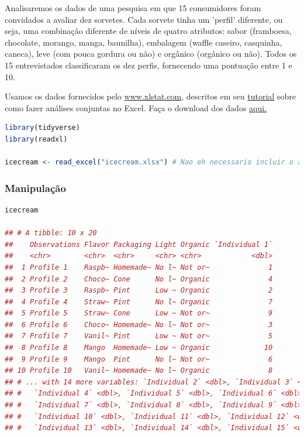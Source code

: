 \documentclass{article}
\begin{document}
Analisaremos os dados de uma pesquisa em que 15 consumidores foram convidados a avaliar dez sorvetes. Cada sorvete tinha um 'perfil' diferente, ou seja, uma combinação diferente de níveis de quatro atributos: sabor (framboesa, chocolate, morango, manga, baunilha), embalagem (waffle caseiro, casquinha, caneca), leve (com pouca gordura ou não) e orgânico (orgânico ou não). Todos os 15 entrevistados classificaram os dez perfis, fornecendo uma pontuação entre 1 e 10.

Usamos os dados fornecidos pelo \href{https://bookdown.org/content/1340/www.xlstat.com}{www.xlstat.com}, descritos em seu \href{https://help.xlstat.com/customer/en/portal/articles/2062346-conjoint-analysis-in-excel-tutorial?b_id=9283}{tutorial} sobre como fazer análises conjuntas no Excel. Faça o download dos dados \href{http://users.telenet.be/samuelfranssens/tutorial_data/icecream.xlsx}{aqui.}

\begin{lstlisting}[language=R]
library(tidyverse)
library(readxl)

icecream <- read_excel("icecream.xlsx") # Nao eh necessario incluir o argumento da planilha quando houver apenas uma planilha no arquivo do Excel
\end{lstlisting}

\subsubsection{Manipulação}

\begin{lstlisting}[language=R]
icecream

## # A tibble: 10 x 20
##    Observations Flavor Packaging Light Organic `Individual 1`
##    <chr>        <chr>  <chr>     <chr> <chr>            <dbl>
##  1 Profile 1    Raspb~ Homemade~ No l~ Not or~              1
##  2 Profile 2    Choco~ Cone      No l~ Organic              4
##  3 Profile 3    Raspb~ Pint      Low ~ Organic              2
##  4 Profile 4    Straw~ Pint      No l~ Organic              7
##  5 Profile 5    Straw~ Cone      Low ~ Not or~              9
##  6 Profile 6    Choco~ Homemade~ No l~ Not or~              3
##  7 Profile 7    Vanil~ Pint      Low ~ Not or~              5
##  8 Profile 8    Mango  Homemade~ Low ~ Organic             10
##  9 Profile 9    Mango  Pint      No l~ Not or~              6
## 10 Profile 10   Vanil~ Homemade~ No l~ Organic              8
## # ... with 14 more variables: `Individual 2` <dbl>, `Individual 3` <dbl>,
## #   `Individual 4` <dbl>, `Individual 5` <dbl>, `Individual 6` <dbl>,
## #   `Individual 7` <dbl>, `Individual 8` <dbl>, `Individual 9` <dbl>,
## #   `Individual 10` <dbl>, `Individual 11` <dbl>, `Individual 12` <dbl>,
## #   `Individual 13` <dbl>, `Individual 14` <dbl>, `Individual 15` <dbl>

\end{lstlisting}
\end{document}
